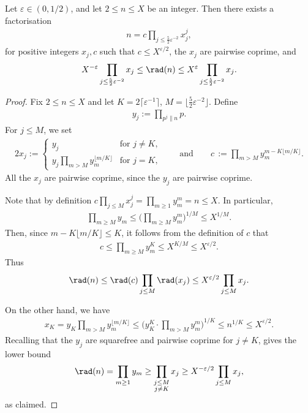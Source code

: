 \begin{lemma}\label{lem:DiophantineFactor}
  \leanok
Let $\varepsilon\in (0,1/2)$, and let $2\leq n\leq X$ be an integer. Then there exists a factorisation
\begin{align*}
n=c\prod_{j\leq \frac{5}{2}\varepsilon^{-2}}x_j^{j},
\end{align*}
for positive integers $x_j,c$ such that $c\leq X^{\varepsilon/2}$, the $x_j$ are pairwise coprime, and \begin{align*}
X^{-\varepsilon}\prod_{j\leq \frac{5}{2}\varepsilon^{-2}}x_j \leq \rad(n) \leq X^{\varepsilon}\prod_{j\leq \frac{5}{2}\varepsilon^{-2}}x_j.
\end{align*}
\end{lemma}
\begin{proof}
  \leanok
  Fix $2\le n\le X$ and let $K=2\lceil \varepsilon^{-1}\rceil$, $M=\lfloor \frac{5}{2}\varepsilon^{-2}\rfloor$. Define
\begin{align*}
y_j:=\prod_{p^j\|n} p.
\end{align*}
For $j\leq M$, we set
\begin{alignat*}{2}
x_j:=\begin{cases}y_j & \text{for $j\neq K$},\\
y_j\prod_{m>M}y_m^{\lfloor m/K\rfloor} & \text{for $j=K$},
\end{cases}\qquad\text{and}\qquad
c\,:=\prod_{m>M}y_m^{m-K\lfloor m/K\rfloor}.
\end{alignat*}
All the $x_j$ are pairwise coprime, since the $y_j$ are pairwise coprime.


Note that by definition $c\prod_{j\leq M}x_j^j=\prod_{m\geq 1}y_m^m=n\leq X$. In particular,
\begin{align*}
\prod_{m\geq M}y_m\leq \Big(\prod_{m\geq M}y_m^{m}\Big)^{1/M}\leq X^{1/M}.
\end{align*}
Then, since $m-K\lfloor m/K\rfloor \le K$, it follows from the definition of $c$ that
\begin{align*}
c\leq \prod_{m\geq M}y_m^K\leq X^{K/M}\leq X^{\varepsilon/2}.
\end{align*}
Thus
\[
\rad(n)\leq \rad(c)\prod_{j\leq M}\rad(x_j)\leq X^{\varepsilon/2} \prod_{j\leq M} x_j.
\]

On the other hand, we have
\begin{align*}
x_K = y_K\prod_{m> M}y_m^{\lfloor m/K\rfloor}\leq \Big(y_K^K\cdot\prod_{m> M}y_m^m\Big)^{1/K}\leq n^{1/K}\leq X^{\varepsilon/2}.
\end{align*}
Recalling that the $y_j$ are squarefree and pairwise coprime for $j\neq K$, gives the lower bound
\[
\rad(n)=\prod_{m\geq 1}y_m \geq \prod_{\substack{j\leq M\\j\neq K}}x_j\geq X^{-\varepsilon/2}\prod_{j\leq M}x_j,
\]
as claimed.
\end{proof}

